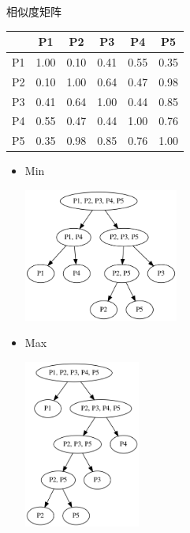 \documentclass[12pt, UTF8]{article}
\begin{document}
\begin{table}[htbp]
  \begin{center}
  相似度矩阵\\
  \begin{tabular}{|c|c|c|c|c|c|}
    \hline
    & P1   & P2   & P3   & P4   & P5   \\ \hline
    P1 & 1.00 & 0.10 & 0.41 & 0.55 & 0.35 \\ \hline
    P2 & 0.10 & 1.00 & 0.64 & 0.47 & 0.98 \\ \hline
    P3 & 0.41 & 0.64 & 1.00 & 0.44 & 0.85 \\ \hline
    P4 & 0.55 & 0.47 & 0.44 & 1.00 & 0.76 \\ \hline
    P5 & 0.35 & 0.98 & 0.85 & 0.76 & 1.00 \\ \hline
  \end{tabular}
\end{center}
\end{table}

\begin{itemize}
  \item Min
  \begin{center}
    \includegraphics[width=0.4\textwidth]{min_hierarchical.png}
  \end{center}
  \item Max
  \begin{center}
    \includegraphics[width=0.3\textwidth]{max_hierarchical.png}
  \end{center}
\end{itemize}
\end{document}

